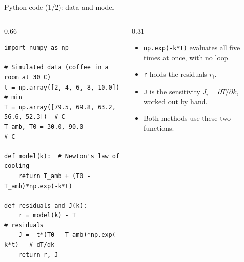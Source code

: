 \documentclass[aspectratio=169,10pt]{beamer}
\begin{document}
\begin{frame}[fragile]{Python code (1/2): data and model}
\begin{columns}[T]
\begin{column}{0.66\textwidth}
\begin{lstlisting}
import numpy as np

# Simulated data (coffee in a room at 30 C)
t = np.array([2, 4, 6, 8, 10.0])              # min
T = np.array([79.5, 69.8, 63.2, 56.6, 52.3])  # C
T_amb, T0 = 30.0, 90.0                        # C

def model(k):  # Newton's law of cooling
    return T_amb + (T0 - T_amb)*np.exp(-k*t)

def residuals_and_J(k):
    r = model(k) - T                   # residuals
    J = -t*(T0 - T_amb)*np.exp(-k*t)   # dT/dk
    return r, J
\end{lstlisting}
\end{column}
\begin{column}{0.31\textwidth}
\small
\begin{itemize}
  \item \texttt{np.exp(-k*t)} evaluates all five times at once, with no loop.
  \item \texttt{r} holds the residuals $r_i$.
  \item \texttt{J} is the sensitivity $J_i = \partial T/\partial k$, worked out by hand.
  \item Both methods use these two functions.
\end{itemize}
\end{column}
\end{columns}
\end{frame}
\end{document}
